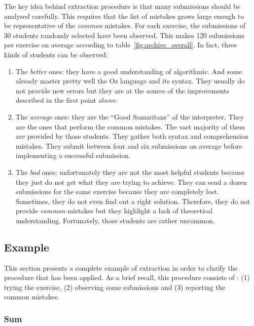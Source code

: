 \documentclass[11pt,a4paper,twoside,openright]{report}
\begin{document}
The key idea behind extraction procedure is that many submissions should be 
analysed carefully. This requires that the list of mistakes grows 
large enough to be representative of the \textit{common} mistakes. For each 
exercise, the submissions of 30 students randomly selected have been observed. 
This makes 120 submissions per exercise on average according to 
table~\ref{fig:archive_overall}. In fact, three kinds of students can be 
observed:
\begin{enumerate}
 \item The \textit{better} ones: they have a good understanding of algorithmic. 
And some already master pretty well the Oz language and its syntax. They 
usually do not provide new errors but they are at the source of the improvements 
described in the first point above.
\item The \textit{average} ones: they are the \enquote{Good Samaritans} of the 
interpreter. They are the ones that perform the common mistakes. The vast 
majority of them are provided by those students. They gather both syntax and 
comprehension mistakes. They submit between four and six 
submissions on average before implementing a successful submission.
\item The \textit{bad} ones: unfortunately they are not the most helpful 
students because they just do not get what they are trying to achieve. They can send 
a dozen submissions for the same exercise because they are completely lost. 
Sometimes, they do not even find out a right solution. Therefore, they do not 
provide \textit{common} mistakes but they highlight a lack of theoretical 
understanding. Fortunately, those students are rather uncommon.
\end{enumerate}

\subsection{Example}

This section presents a complete example of extraction in order to clarify the 
procedure that has been applied. As a brief recall, this procedure consists of 
: (1) trying the exercise, (2) observing some submissions and (3) reporting 
the common mistakes.

\subsubsection{Sum} \label{sssec:sum}
\end{document}
